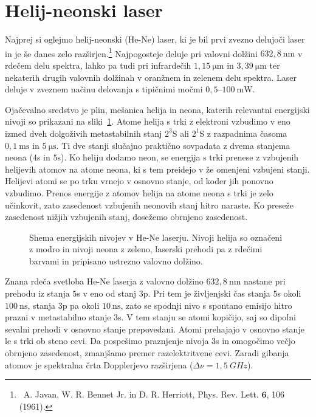 \section{Helij-neonski laser}
Najprej si oglejmo helij-neonski (He-Ne) laser, ki je bil prvi zvezno 
delujoči laser in je še danes zelo razširjen.\footnote{~A. Javan, W. R. Bennet Jr. in 
D. R. Herriott, Phys. Rev. Lett. $\mathbf{6}$, 106 (1961).} Najpogosteje deluje 
pri valovni dolžini $632,8~\si{\nano\metre}$ v rdečem delu spektra, lahko 
pa tudi pri infrardečih $1,15~\si{\micro\metre}$ in 
$3,39~\si{\micro\metre}$ ter nekaterih drugih
valovnih dolžinah v oranžnem in zelenem delu spektra. Laser deluje v zveznem 
načinu delovanja s tipičnimi močmi $0,5$--$100~\si{\milli\watt}$.

Ojačevalno sredstvo je plin, mešanica helija in neona, katerih relevantni
energijski nivoji so prikazani na sliki~\ref{fig:HeNeE}. 
Atome helija
s trki z elektroni vzbudimo v eno izmed dveh dolgoživih metastabilnih stanj $2^3$S ali
$2^1$S z razpadnima časoma $0,1~\si{\milli\second}$ in $5~\si{\micro\second}$.
Ti dve stanji slučajno praktično sovpadata z dvema stanjema neona ($4$s in $5$s).
Ko heliju dodamo neon, se energija s trki 
prenese z vzbujenih helijevih atomov na atome neona, ki s tem preidejo v 
že omenjeni vzbujeni stanji. Helijevi atomi se po trku vrnejo v osnovno stanje, od koder
jih ponovno vzbudimo. Prenos energije z atomov helija na atome neona s trki je 
zelo učinkovit, zato zasedenost vzbujenih neonovih stanj hitro naraste. Ko preseže 
zasedenost nižjih vzbujenih stanj, dosežemo obrnjeno zasedenost. 

\begin{figure}[ht]
\centering
\def\svgwidth{100truemm} 

\caption{Shema energijskih nivojev v He-Ne laserju. Nivoji helija so označeni
z modro in nivoji neona z zeleno, laserski prehodi pa z rdečimi barvami in pripisano
ustrezno valovno dolžino.}
\label{fig:HeNeE}
\end{figure}

Znana rdeča svetloba He-Ne laserja z valovno dolžino $632,8~\si{\nano\metre}$ nastane 
pri prehodu iz stanja $5$s v eno od stanj $3$p. Pri tem je življenjski čas 
stanja $5$s okoli $100~\si{\nano\second}$, stanja $3$p pa okoli $10~\si{\nano\second}$, zato
se spodnji nivo s spontano emisijo hitro prazni v metastabilno stanje $3$s. 
V tem stanju se atomi kopičijo, saj so dipolni sevalni prehodi v osnovno stanje prepovedani.
Atomi prehajajo v osnovno stanje le s trki ob steno cevi. Da pospešimo
praznjenje nivoja $3$s in omogočimo večjo obrnjeno zasedenost, zmanjšamo 
premer razelektritvene cevi. Zaradi gibanja atomov je spektralna 
črta Dopplerjevo razširjena ($\Delta \nu = 1,5~\si{GHz}$). 

